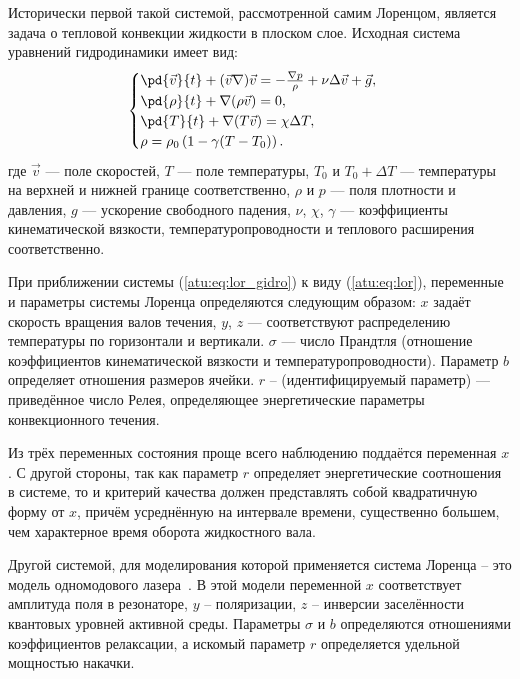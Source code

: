 Исторически первой такой системой, рассмотренной самим Лоренцом, является
задача о тепловой конвекции жидкости в плоском слое. Исходная система
уравнений гидродинамики имеет вид:
%
%
\begin{equation}
\begin{cases}
  \pd{\vec{v}}{t} + ( \vec{v} \nabla ) \vec{v} = - \frac{\nabla p}{\rho} + \nu \Delta \vec{v} + \vec{g}, \\
  \pd{\rho}{t} + \nabla ( \rho \vec{v} ) = 0 , \\
  \pd{T}{t} +\nabla ( T \vec{v} ) = \chi \Delta T , \\
  \rho = \rho_0 \left( 1 - \gamma (T - T_0) \right) .
\end{cases}
\label{atu:eq:lor_gidro}
\end{equation}
%
где
$\vec{v} $   --- поле скоростей,
$T$ --- поле температуры,
$T_0$ и $T_0+\Delta T$   --- температуры на верхней и нижней границе соответственно,
$\rho$ и $p$ --- поля плотности и давления,
$g$ --- ускорение свободного падения,
$\nu$, $\chi$, $\gamma$  --- коэффициенты кинематической вязкости, температуропроводности и
теплового расширения соответственно.

При приближении системы (\ref{atu:eq:lor_gidro}) к виду (\ref{atu:eq:lor}),
переменные и параметры системы
Лоренца определяются следующим образом: $x$ задаёт скорость вращения валов
течения, $y$, $z$ --- соответствуют распределению температуры по горизонтали и
вертикали.
$\sigma$   --- число Прандтля (отношение коэффициентов кинематической вязкости и
температуропроводности). Параметр $b$ определяет отношения размеров ячейки.
$r$ -- (идентифицируемый параметр) --- приведённое число Релея, определяющее
энергетические параметры конвекционного течения.

Из трёх переменных состояния проще всего наблюдению поддаётся переменная
$x$. С другой стороны, так как параметр $r$ определяет энергетические
соотношения в системе, то и критерий качества должен представлять собой
квадратичную форму от $x$, причём усреднённую на интервале времени,
существенно большем, чем характерное время оборота жидкостного вала.

Другой системой, для моделирования которой применяется система Лоренца --
это модель одномодового лазера~\cite{andrianov_laser}.
В этой модели переменной $x$ соответствует
амплитуда поля в резонаторе, $y$ -- поляризации, $z$ -- инверсии заселённости
квантовых уровней активной среды. Параметры $\sigma$ и $b$
определяются отношениями коэффициентов релаксации, а искомый параметр $r$
определяется удельной мощностью накачки.


